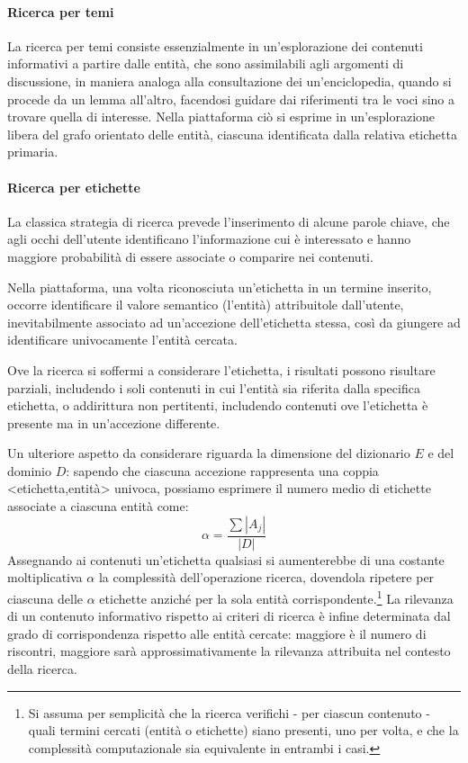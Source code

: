 \paragraph{Ricerca per temi}
La ricerca per temi consiste essenzialmente in un'esplorazione dei contenuti informativi a partire dalle entità, che sono assimilabili agli argomenti di discussione, in maniera analoga alla consultazione dei un'enciclopedia, quando si procede da un lemma all'altro, facendosi guidare dai riferimenti tra le voci sino a trovare quella di interesse. Nella piattaforma ciò si esprime in un'esplorazione libera del grafo orientato delle entità, ciascuna identificata dalla relativa etichetta primaria.

\paragraph{Ricerca per etichette}
La classica strategia di ricerca prevede l'inserimento di alcune parole chiave, che agli occhi dell'utente identificano l'informazione cui è interessato e hanno maggiore probabilità di essere associate o comparire nei contenuti.

Nella piattaforma, una volta riconosciuta un'etichetta in un termine inserito, occorre identificare il valore semantico (l'entità) attribuitole dall'utente, inevitabilmente associato ad un'accezione dell'etichetta stessa, così da giungere ad identificare univocamente l'entità cercata.

Ove la ricerca si soffermi a considerare l’etichetta, i risultati possono risultare parziali, includendo i soli contenuti in cui l’entità sia riferita dalla specifica etichetta, o addirittura non pertitenti, includendo contenuti ove l'etichetta è presente ma in un'accezione differente.

Un ulteriore aspetto da considerare riguarda la dimensione del dizionario $E$ e del dominio $D$: sapendo che ciascuna accezione rappresenta una coppia <etichetta,entità> univoca, possiamo esprimere il numero medio di etichette associate a ciascuna entità come:
\begin{equation}
\alpha = \frac{\sum{\left|A_j\right|}}{\left|D\right|}
\end{equation}
Assegnando ai contenuti un'etichetta qualsiasi si aumenterebbe di una costante moltiplicativa $\alpha$ la complessità dell'operazione ricerca, dovendola ripetere per ciascuna delle $\alpha$ etichette anziché per la sola entità corrispondente.\footnote{Si assuma per semplicità che la ricerca verifichi - per ciascun contenuto - quali termini cercati (entità o etichette) siano presenti, uno per volta, e che la complessità computazionale sia equivalente in entrambi i casi.}
\newline
\newline
La rilevanza di un contenuto informativo rispetto ai criteri di ricerca è infine determinata dal grado di corrispondenza rispetto alle entità cercate: maggiore è il numero di riscontri, maggiore sarà approssimativamente la rilevanza attribuita nel contesto della ricerca.

